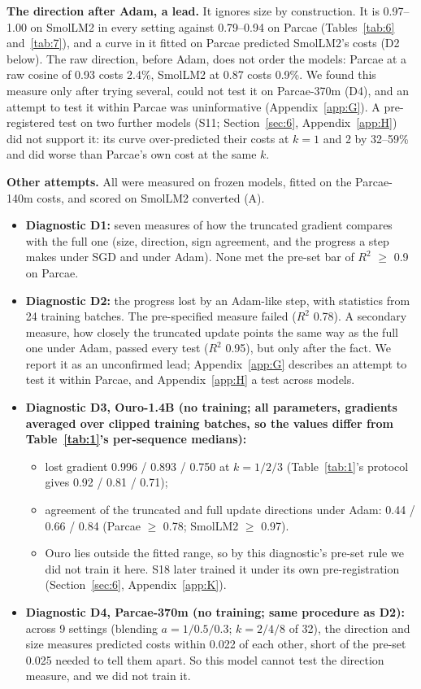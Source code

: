 \documentclass[10pt]{article}
\begin{document}
\textbf{The direction after Adam, a lead.} It ignores size by construction. It is 0.97--1.00 on SmolLM2 in every setting against 0.79--0.94 on Parcae (Tables~\ref{tab:6} and~\ref{tab:7}), and a curve in it fitted on Parcae predicted SmolLM2's costs (D2 below). The raw direction, before Adam, does not order the models: Parcae at a raw cosine of 0.93 costs 2.4\%, SmolLM2 at 0.87 costs 0.9\%. We found this measure only after trying several, could not test it on Parcae-370m (D4), and an attempt to test it within Parcae was uninformative (Appendix~\ref{app:G}). A pre-registered test on two further models (S11; Section~\ref{sec:6}, Appendix~\ref{app:H}) did not support it: its curve over-predicted their costs at $k = 1$ and 2 by 32--59\% and did worse than Parcae's own cost at the same $k$.

\textbf{Other attempts.} All were measured on frozen models, fitted on the Parcae-140m costs, and scored on SmolLM2 converted (A).

\begin{itemize}
\item \textbf{Diagnostic D1:} seven measures of how the truncated gradient compares with the full one (size, direction, sign agreement, and the progress a step makes under SGD and under Adam). None met the pre-set bar of $R^{2}$ $\geq$ 0.9 on Parcae.
\item \textbf{Diagnostic D2:} the progress lost by an Adam-like step, with statistics from 24 training batches. The pre-specified measure failed ($R^{2}$ 0.78). A secondary measure, how closely the truncated update points the same way as the full one under Adam, passed every test ($R^{2}$ 0.95), but only after the fact. We report it as an unconfirmed lead; Appendix~\ref{app:G} describes an attempt to test it within Parcae, and Appendix~\ref{app:H} a test across models.
\item \textbf{Diagnostic D3, Ouro-1.4B (no training; all parameters, gradients averaged over clipped training batches, so the values differ from Table~\ref{tab:1}'s per-sequence medians):}
\begin{itemize}
\item lost gradient 0.996 / 0.893 / 0.750 at $k = 1 / 2 / 3$ (Table~\ref{tab:1}'s protocol gives 0.92 / 0.81 / 0.71);
\item agreement of the truncated and full update directions under Adam: 0.44 / 0.66 / 0.84 (Parcae $\geq$ 0.78; SmolLM2 $\geq$ 0.97).
\item Ouro lies outside the fitted range, so by this diagnostic's pre-set rule we did not train it here. S18 later trained it under its own pre-registration (Section~\ref{sec:6}, Appendix~\ref{app:K}).
\end{itemize}
\item \textbf{Diagnostic D4, Parcae-370m (no training; same procedure as D2):} across 9 settings (blending $a = 1 / 0.5 / 0.3$; $k = 2 / 4 / 8$ of 32), the direction and size measures predicted costs within 0.022 of each other, short of the pre-set 0.025 needed to tell them apart. So this model cannot test the direction measure, and we did not train it.
\end{itemize}
\end{document}
